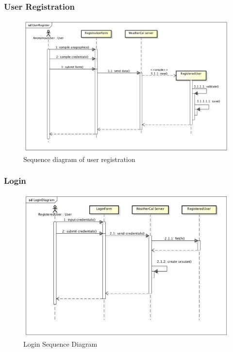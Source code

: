 \subsubsection{User Registration}
\begin{center}
 \begin{figure}[H]
    \includegraphics[width=1\textwidth]{../UMLDiagram/sequence/UserRegister/UserRegister.png}
    \caption{Sequence diagram of user registration}
     \label{fig:regseqdiag}
     \end{figure}
   \end{center}  

\subsubsection{Login}
\begin{center}
 \begin{figure}[H]
    \includegraphics[width=1\textwidth]{../UMLDiagram/sequence/LoginDiagram/LoginDiagram.png}
    \caption{Login Sequence Diagram}
     \label{fig:logseqdiag}
     \end{figure}
   \end{center}  
